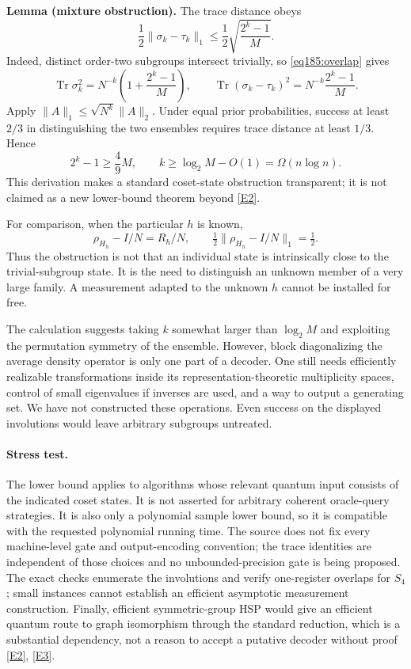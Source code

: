 \documentclass[11pt,a4paper]{article}
\newcommand{\eref}[2]{\hyperlink{extra:#1:#2}{[E#2]}}
\numberwithin{equation}{section}
\begin{document}
\textbf{Lemma (mixture obstruction).} The trace distance obeys
\begin{equation}\label{eq185:distance}
 \frac12\|\sigma_k-\tau_k\|_1
 \le\frac12\sqrt{\frac{2^k-1}{M}}.
\end{equation}
Indeed, distinct order-two subgroups intersect trivially, so \eqref{eq185:overlap} gives
\[
 \operatorname{Tr}\sigma_k^2=N^{-k}\left(1+\frac{2^k-1}{M}\right),
 \qquad
 \operatorname{Tr}(\sigma_k-\tau_k)^2=N^{-k}\frac{2^k-1}{M}.
\]
Apply $\|A\|_1\le\sqrt{N^k}\|A\|_2$. Under equal prior probabilities, success at least $2/3$ in distinguishing the two ensembles requires trace distance at least $1/3$. Hence
\[
 2^k-1\ge\frac49M,\qquad
 k\ge\log_2M-O(1)=\Omega(n\log n).
\]
This derivation makes a standard coset-state obstruction transparent; it is not claimed as a new lower-bound theorem beyond \eref{statement}{2}.

For comparison, when the particular $h$ is known,
\[
 \rho_{H_h}-I/N=R_h/N,
 \qquad \tfrac12\|\rho_{H_h}-I/N\|_1=\tfrac12.
\]
Thus the obstruction is not that an individual state is intrinsically close to the trivial-subgroup state. It is the need to distinguish an unknown member of a very large family. A measurement adapted to the unknown $h$ cannot be installed for free.

The calculation suggests taking $k$ somewhat larger than $\log_2M$ and exploiting the permutation symmetry of the ensemble. However, block diagonalizing the average density operator is only one part of a decoder. One still needs efficiently realizable transformations inside its representation-theoretic multiplicity spaces, control of small eigenvalues if inverses are used, and a way to output a generating set. We have not constructed these operations. Even success on the displayed involutions would leave arbitrary subgroups untreated.

\paragraph{Stress test.}
The lower bound applies to algorithms whose relevant quantum input consists of the indicated coset states. It is not asserted for arbitrary coherent oracle-query strategies. It is also only a polynomial sample lower bound, so it is compatible with the requested polynomial running time. The source does not fix every machine-level gate and output-encoding convention; the trace identities are independent of those choices and no unbounded-precision gate is being proposed. The exact checks enumerate the involutions and verify one-register overlaps for $S_4$; small instances cannot establish an efficient asymptotic measurement construction. Finally, efficient symmetric-group HSP would give an efficient quantum route to graph isomorphism through the standard reduction, which is a substantial dependency, not a reason to accept a putative decoder without proof \eref{statement}{2}, \eref{statement}{3}.
\end{document}
